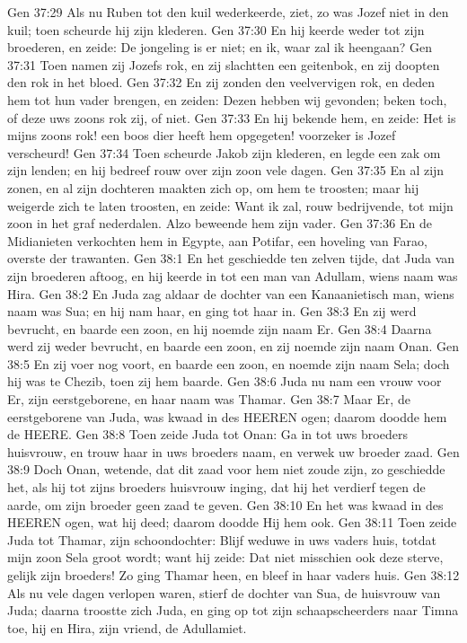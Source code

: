 Gen 37:29  Als nu Ruben tot den kuil wederkeerde, ziet, zo was Jozef niet in den kuil; toen scheurde hij zijn klederen.
Gen 37:30  En hij keerde weder tot zijn broederen, en zeide: De jongeling is er niet; en ik, waar zal ik heengaan?
Gen 37:31  Toen namen zij Jozefs rok, en zij slachtten een geitenbok, en zij doopten den rok in het bloed.
Gen 37:32  En zij zonden den veelvervigen rok, en deden hem tot hun vader brengen, en zeiden: Dezen hebben wij gevonden; beken toch, of deze uws zoons rok zij, of niet.
Gen 37:33  En hij bekende hem, en zeide: Het is mijns zoons rok! een boos dier heeft hem opgegeten! voorzeker is Jozef verscheurd!
Gen 37:34  Toen scheurde Jakob zijn klederen, en legde een zak om zijn lenden; en hij bedreef rouw over zijn zoon vele dagen.
Gen 37:35  En al zijn zonen, en al zijn dochteren maakten zich op, om hem te troosten; maar hij weigerde zich te laten troosten, en zeide: Want ik zal, rouw bedrijvende, tot mijn zoon in het graf nederdalen. Alzo beweende hem zijn vader.
Gen 37:36  En de Midianieten verkochten hem in Egypte, aan Potifar, een hoveling van Farao, overste der trawanten.
Gen 38:1  En het geschiedde ten zelven tijde, dat Juda van zijn broederen aftoog, en hij keerde in tot een man van Adullam, wiens naam was Hira.
Gen 38:2  En Juda zag aldaar de dochter van een Kanaanietisch man, wiens naam was Sua; en hij nam haar, en ging tot haar in.
Gen 38:3  En zij werd bevrucht, en baarde een zoon, en hij noemde zijn naam Er.
Gen 38:4  Daarna werd zij weder bevrucht, en baarde een zoon, en zij noemde zijn naam Onan.
Gen 38:5  En zij voer nog voort, en baarde een zoon, en noemde zijn naam Sela; doch hij was te Chezib, toen zij hem baarde.
Gen 38:6  Juda nu nam een vrouw voor Er, zijn eerstgeborene, en haar naam was Thamar.
Gen 38:7  Maar Er, de eerstgeborene van Juda, was kwaad in des HEEREN ogen; daarom doodde hem de HEERE.
Gen 38:8  Toen zeide Juda tot Onan: Ga in tot uws broeders huisvrouw, en trouw haar in uws broeders naam, en verwek uw broeder zaad.
Gen 38:9  Doch Onan, wetende, dat dit zaad voor hem niet zoude zijn, zo geschiedde het, als hij tot zijns broeders huisvrouw inging, dat hij het verdierf tegen de aarde, om zijn broeder geen zaad te geven.
Gen 38:10  En het was kwaad in des HEEREN ogen, wat hij deed; daarom doodde Hij hem ook.
Gen 38:11  Toen zeide Juda tot Thamar, zijn schoondochter: Blijf weduwe in uws vaders huis, totdat mijn zoon Sela groot wordt; want hij zeide: Dat niet misschien ook deze sterve, gelijk zijn broeders! Zo ging Thamar heen, en bleef in haar vaders huis.
Gen 38:12  Als nu vele dagen verlopen waren, stierf de dochter van Sua, de huisvrouw van Juda; daarna troostte zich Juda, en ging op tot zijn schaapscheerders naar Timna toe, hij en Hira, zijn vriend, de Adullamiet.
